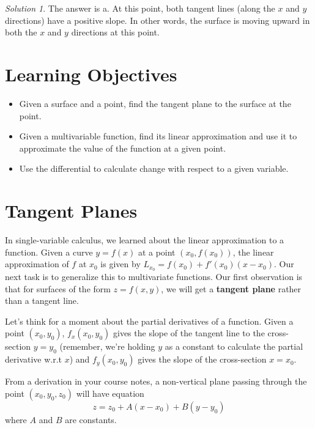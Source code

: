 \documentclass[
]{book}
\providecommand{\tightlist}{%
  \setlength{\itemsep}{0pt}\setlength{\parskip}{0pt}}
\theoremstyle{definition}
\theoremstyle{definition}
\theoremstyle{definition}
\theoremstyle{definition}
\theoremstyle{remark}
\newtheorem*{solution}{Solution}
\begin{document}
\begin{solution}

The answer is a. At this point, both tangent lines (along the \(x\) and \(y\) directions) have a positive slope. In other words, the surface is moving upward in both the \(x\) and \(y\) directions at this point.

\end{solution}

\hypertarget{learning-objectives-3}{%
\section{Learning Objectives}\label{learning-objectives-3}}

\begin{itemize}
\tightlist
\item
  Given a surface and a point, find the tangent plane to the surface at the point.
\item
  Given a multivariable function, find its linear approximation and use it to approximate the value of the function at a given point.
\item
  Use the differential to calculate change with respect to a given variable.
\end{itemize}

\hypertarget{tangent-planes}{%
\section{Tangent Planes}\label{tangent-planes}}

In single-variable calculus, we learned about the linear approximation to a function. Given a curve \(y=f(x)\) at a point \((x_0, f(x_0))\), the linear approximation of \(f\) at \(x_0\) is given by \(L_{x_0}=f(x_0)+f'(x_0)(x-x_0)\). Our next task is to generalize this to multivariate functions. Our first observation is that for surfaces of the form \(z=f(x,y)\), we will get a \textbf{tangent plane} rather than a tangent line.

Let's think for a moment about the partial derivatives of a function. Given a point \((x_0,y_0)\), \(f_x(x_0,y_0)\) gives the slope of the tangent line to the cross-section \(y=y_0\) (remember, we're holding \(y\) as a constant to calculate the partial derivative w.r.t \(x\)) and \(f_y(x_0, y_0)\) gives the slope of the cross-section \(x=x_0\).

From a derivation in your course notes, a non-vertical plane passing through the point \((x_0, y_0, z_0)\) will have equation \[z=z_0+A(x-x_0)+B(y-y_0)\] where \(A\) and \(B\) are constants.
\end{document}
